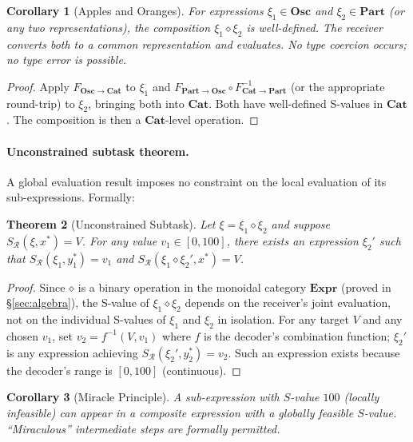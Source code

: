 \documentclass[twocolumn,11pt,a4paper]{article}
\newtheorem{theorem}{Theorem}[section]
\newtheorem{corollary}[theorem]{Corollary}
\theoremstyle{definition}
\theoremstyle{remark}
\newcommand{\Expr}{\mathbf{Expr}}
\newcommand{\Recv}{\mathcal{R}}
\newcommand{\comp}{\mathbin{\diamond}}
\newcommand{\Osc}{\mathbf{Osc}}
\newcommand{\Cat}{\mathbf{Cat}}
\newcommand{\Part}{\mathbf{Part}}
\begin{document}
\begin{corollary}[Apples and Oranges]
\label{cor:applesOranges}
For expressions $\xi_1 \in \Osc$ and $\xi_2 \in \Part$ (or any two
representations), the composition $\xi_1 \comp \xi_2$ is well-defined.
The receiver converts both to a common representation and evaluates.
No type coercion occurs; no type error is possible.
\end{corollary}

\begin{proof}
Apply $F_{\Osc \to \Cat}$ to $\xi_1$ and $F_{\Part \to \Osc} \circ
F_{\Cat \to \Part}^{-1}$ (or the appropriate round-trip) to $\xi_2$,
bringing both into $\Cat$.  Both have well-defined S-values in $\Cat$.
The composition is then a $\Cat$-level operation.
\end{proof}

\paragraph{Unconstrained subtask theorem.}
A global evaluation result imposes no constraint on the local evaluation
of its sub-expressions.  Formally:

\begin{theorem}[Unconstrained Subtask]
\label{thm:unconstrained}
Let $\xi = \xi_1 \comp \xi_2$ and suppose $S_\Recv(\xi, x^*) = V$.
For any value $v_1 \in [0,100]$, there exists an expression
$\xi_2'$ such that $S_\Recv(\xi_1, y_1^*) = v_1$ and
$S_\Recv(\xi_1 \comp \xi_2', x^*) = V$.
\end{theorem}
\begin{proof}
Since $\comp$ is a binary operation in the monoidal category $\Expr$
(proved in \S\ref{sec:algebra}), the S-value of $\xi_1 \comp \xi_2$
depends on the receiver's joint evaluation, not on the individual
S-values of $\xi_1$ and $\xi_2$ in isolation.  For any target $V$ and
any chosen $v_1$, set $v_2 = f^{-1}(V, v_1)$ where $f$ is the
decoder's combination function; $\xi_2'$ is any expression achieving
$S_\Recv(\xi_2', y_2^*) = v_2$.  Such an expression exists because
the decoder's range is $[0,100]$ (continuous).
\end{proof}

\begin{corollary}[Miracle Principle]
\label{cor:miracle}
A sub-expression with $S$-value $100$ (locally infeasible) can appear
in a composite expression with a globally feasible $S$-value.
``Miraculous'' intermediate steps are formally permitted.
\end{corollary}
\end{document}
